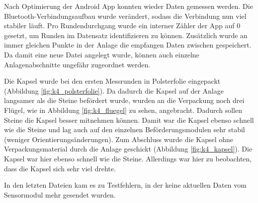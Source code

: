 Nach Optimierung der Android App konnten wieder Daten gemessen werden. Die Bluetooth-Verbindungsaufbau wurde verändert, sodass die Verbindung nun viel stabiler läuft. Pro Rundendurchgang wurde ein interner Zähler der App auf 0 gesetzt, um Runden im Datensatz identifizieren zu können. Zusätzlich wurde an immer gleichen Punkte in der Anlage die empfangen Daten zwischen gespeichert. Da damit eine neue Datei angelegt wurde, können auch einzelne Anlagenabschnitte ungefähr zugeordnet werden.

Die Kapsel wurde bei den ersten Messrunden in Polsterfolie eingepackt (Abbildung \ref{fig:k4_polsterfolie}). Da dadurch die Kapsel auf der Anlage langsamer als die Steine befördert wurde, wurden an die Verpackung noch drei Flügel, wie in Abbildung \ref{fig:k4_fluegel} zu sehen, angebracht. Dadurch sollen Steine die Kapsel besser mitnehmen können. Damit war die Kapsel ebenso schnell wie die Steine und lag auch auf den einzelnen Beförderungsmodulen sehr stabil (weniger Orientierungsänderungen). Zum Abschluss wurde die Kapsel ohne Verpackungsmaterial durch die Anlage geschickt (Abbildung \ref{fig:k4_kapsel}). Die Kapsel war hier ebenso schnell wie die Steine. Allerdings war hier zu beobachten, dass die Kapsel sich sehr viel drehte. 

In den letzten Dateien kam es zu Testfehlern, in der keine aktuellen Daten vom Sensormodul mehr gesendet wurden.

